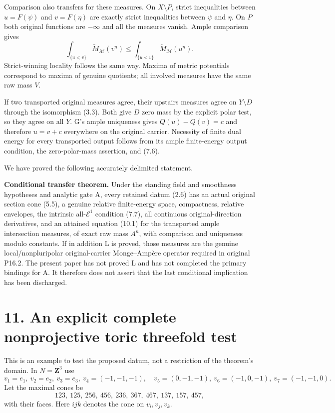 \documentclass[
  10pt,
]{article}
\begin{document}
Comparison also transfers for these measures. On \(X\setminus P\),
strict inequalities between \(u=F(\psi)\) and \(v=F(\eta)\) are exactly
strict inequalities between \(\psi\) and \(\eta\). On \(P\) both
original functions are \(-\infty\) and all the measures vanish. Ample
comparison gives \[
 \int_{\{u<v\}}\widetilde M_{\mathcal M}(v^n)
       \leq\int_{\{u<v\}}\widetilde M_{\mathcal M}(u^n).
 \tag{10.2}
\] Strict-winning locality follows the same way. Maxima of metric
potentials correspond to maxima of genuine quotients; all involved
measures have the same raw mass \(V\).

If two transported original measures agree, their upstairs measures
agree on \(Y\setminus D\) through the isomorphism (3.3). Both give \(D\)
zero mass by the explicit polar test, so they agree on all \(Y\). G's
ample uniqueness gives \(Q(u)-Q(v)=c\) and therefore \(u=v+c\)
everywhere on the original carrier. Necessity of finite dual energy for
every transported output follows from its ample finite-energy output
condition, the zero-polar-mass assertion, and (7.6).

We have proved the following accurately delimited statement.

\textbf{Conditional transfer theorem.} Under the standing field and
smoothness hypotheses and analytic gate A, every retained datum (2.6)
has an actual original section cone (5.5), a genuine relative
finite-energy space, compactness, relative envelopes, the intrinsic
all-\(\mathcal E^1\) condition (7.7), all continuous original-direction
derivatives, and an attained equation (10.1) for the transported ample
intersection measures, of exact raw mass \(A^n\), with comparison and
uniqueness modulo constants. If in addition L is proved, those measures
are the genuine local/nonpluripolar original-carrier Monge--Ampère
operator required in original P16.2. The present paper has not proved L
and has not completed the primary bindings for A. It therefore does not
assert that the last conditional implication has been discharged.

\section{11. An explicit complete nonprojective toric threefold
test}\label{an-explicit-complete-nonprojective-toric-threefold-test}

This is an example to test the proposed datum, not a restriction of the
theorem's domain. In \(N=\mathbf Z^3\) use \[
 v_1=e_1,\ v_2=e_2,\ v_3=e_3,\ v_4=(-1,-1,-1),
 \quad v_5=(0,-1,-1),\ v_6=(-1,0,-1),\ v_7=(-1,-1,0).
\] Let the maximal cones be \[
 123,\ 125,\ 256,\ 456,\ 236,\ 367,\ 467,\ 137,\ 157,\ 457,
 \tag{11.1}
\] with their faces. Here \(ijk\) denotes the cone on \(v_i,v_j,v_k\).
\end{document}
